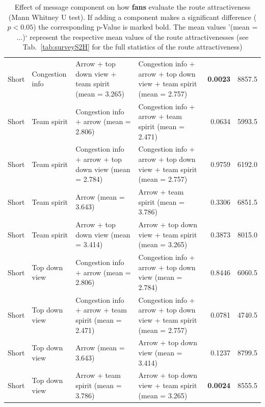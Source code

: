 \begin{table}
\begin{scriptsize}
\begin{tabular}{llllrr}
  Short & Congestion info & Arrow + top down view + team spirit (mean = 3.265) & Congestion info + arrow + top down view + team spirit (mean = 2.757) & \textbf{0.0023} & 8857.5 \\
  Short & Team spirit & Congestion info + arrow (mean = 2.806) & Congestion info + arrow + team spirit (mean = 2.471) & 0.0634 & 5993.5 \\
  Short & Team spirit & Congestion info + arrow + top down view (mean = 2.784) & Congestion info + arrow + top down view + team spirit (mean = 2.757) & 0.9759 & 6192.0 \\
  Short & Team spirit & Arrow (mean = 3.643) & Arrow + team spirit (mean = 3.786) & 0.3306 & 6851.5 \\
  Short & Team spirit & Arrow + top down view (mean = 3.414) & Arrow + top down view + team spirit (mean = 3.265) & 0.3873 & 8015.0 \\
  Short & Top down view & Congestion info + arrow (mean = 2.806) & Congestion info + arrow + top down view (mean = 2.784) & 0.8446 & 6060.5 \\
  Short & Top down view & Congestion info + arrow + team spirit (mean = 2.471) & Congestion info + arrow + top down view + team spirit (mean = 2.757) & 0.0781 & 4740.5 \\
  Short & Top down view & Arrow (mean = 3.643) & Arrow + top down view (mean = 3.414) & 0.1237 & 8799.5 \\
  Short & Top down view & Arrow + team spirit (mean = 3.786) & Arrow + top down view + team spirit (mean = 3.265) & \textbf{0.0024} & 8555.5 \\
   \hline
\end{tabular}
\end{scriptsize}
\caption[]{Effect of message component on how \textbf{fans} evaluate the route attractiveness (Mann Whitney U test). If adding a component makes a significant difference ($p<0.05$) the corresponding p-Value is marked bold. The mean values '(mean = ...)` represent the respective mean values of the route attractivenesses (see Tab.~\ref{tab:surveyS2H} for the full statistics of the route attractiveness)}
\label{tab:surveyS2B}
\end{table}


\clearpage





